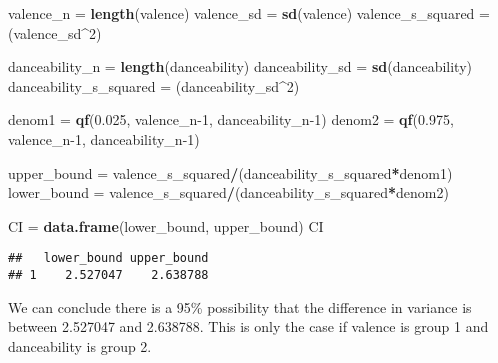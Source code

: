\documentclass[
]{article}
\newenvironment{Shaded}{\begin{snugshade}}{\end{snugshade}}
\newcommand{\DecValTok}[1]{\textcolor[rgb]{0.00,0.00,0.81}{#1}}
\newcommand{\FloatTok}[1]{\textcolor[rgb]{0.00,0.00,0.81}{#1}}
\newcommand{\KeywordTok}[1]{\textcolor[rgb]{0.13,0.29,0.53}{\textbf{#1}}}
\newcommand{\NormalTok}[1]{#1}
\newcommand{\OperatorTok}[1]{\textcolor[rgb]{0.81,0.36,0.00}{\textbf{#1}}}
\newcommand{\StringTok}[1]{\textcolor[rgb]{0.31,0.60,0.02}{#1}}
\begin{document}
\begin{Shaded}
\begin{Highlighting}[]
\NormalTok{valence_n =}\StringTok{ }\KeywordTok{length}\NormalTok{(valence)}
\NormalTok{valence_sd =}\StringTok{ }\KeywordTok{sd}\NormalTok{(valence)}
\NormalTok{valence_s_squared =}\StringTok{ }\NormalTok{(valence_sd}\OperatorTok{^}\DecValTok{2}\NormalTok{)}

\NormalTok{danceability_n =}\StringTok{ }\KeywordTok{length}\NormalTok{(danceability)}
\NormalTok{danceability_sd =}\StringTok{ }\KeywordTok{sd}\NormalTok{(danceability)}
\NormalTok{danceability_s_squared =}\StringTok{ }\NormalTok{(danceability_sd}\OperatorTok{^}\DecValTok{2}\NormalTok{)}

\NormalTok{denom1 =}\StringTok{ }\KeywordTok{qf}\NormalTok{(}\FloatTok{0.025}\NormalTok{, valence_n}\DecValTok{-1}\NormalTok{, danceability_n}\DecValTok{-1}\NormalTok{)}
\NormalTok{denom2 =}\StringTok{ }\KeywordTok{qf}\NormalTok{(}\FloatTok{0.975}\NormalTok{, valence_n}\DecValTok{-1}\NormalTok{, danceability_n}\DecValTok{-1}\NormalTok{)}

\NormalTok{upper_bound =}\StringTok{ }\NormalTok{valence_s_squared}\OperatorTok{/}\NormalTok{(danceability_s_squared}\OperatorTok{*}\NormalTok{denom1)}
\NormalTok{lower_bound =}\StringTok{ }\NormalTok{valence_s_squared}\OperatorTok{/}\NormalTok{(danceability_s_squared}\OperatorTok{*}\NormalTok{denom2)}

\NormalTok{CI =}\StringTok{ }\KeywordTok{data.frame}\NormalTok{(lower_bound, upper_bound)}
\NormalTok{CI}
\end{Highlighting}
\end{Shaded}

\begin{verbatim}
##   lower_bound upper_bound
## 1    2.527047    2.638788
\end{verbatim}

We can conclude there is a 95\% possibility that the difference in
variance is between 2.527047 and 2.638788. This is only the case if
valence is group 1 and danceability is group 2.
\end{document}
